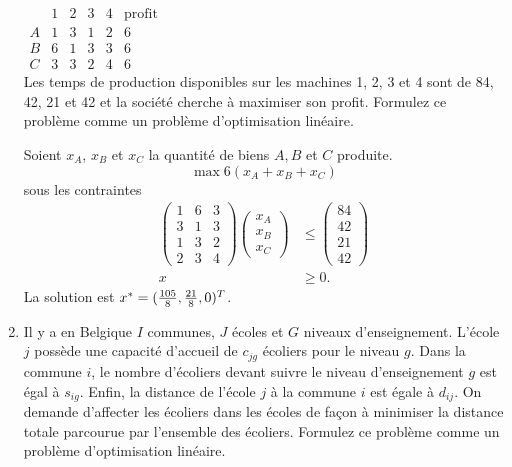 \begin{enumerate}
    $
    \begin{array}{l|llll|l}
      & 1 & 2 & 3 & 4 & \mbox{profit}\\
      \hline
      A & 1 & 3 & 1 & 2 & 6\\
      B & 6 & 1 & 3 & 3 & 6\\
      C & 3 & 3 & 2 & 4 & 6
    \end{array}
    $
    \\


    Les temps de production disponibles sur les machines 1, 2, 3 et 4  sont de 84, 42, 21 et 42 et la société cherche à  maximiser son
    profit. Formulez ce problème comme un problème d'optimisation linéaire.

    \begin{solution}
      Soient $x_{A}$, $x_{B}$ et $x_{C}$
      la quantité de biens $A, B$ et $C$ produite.
      \[ \max 6(x_{A} + x_{B} + x_{C}) \]
      sous les contraintes
      \begin{align*}
        \begin{pmatrix}
          1 & 6 & 3\\
          3 & 1 & 3\\
          1 & 3 & 2\\
          2 & 3 & 4
        \end{pmatrix}
        \begin{pmatrix}
          x_{A}\\
          x_{B}\\
          x_{C}
        \end{pmatrix}
        & \leq
        \begin{pmatrix}
          84\\
          42\\
          21\\
          42
        \end{pmatrix}\\
        x & \geq 0.
      \end{align*}
      La solution est $x^* = (\frac{105}{8},\frac{21}{8},0)^{T}$.
    \end{solution}


  \item Il y a en Belgique $I$ communes, $J$ écoles et $G$ niveaux
    d'enseignement. L'école $j$ possède  une capacité d'accueil de $c_{jg}$
    écoliers pour le niveau $g$. Dans la commune $i$, le nombre d'écoliers devant
    suivre le niveau d'enseignement $g$ est égal à $s_{ig}$. Enfin, la distance de
    l'école $j$ à la commune $i$ est égale à $d_{ij}$. On demande d'affecter les écoliers dans les écoles de façon à minimiser la
    distance totale parcourue par l'ensemble des écoliers. Formulez ce problème comme un problème d'optimisation linéaire.



\end{enumerate}
